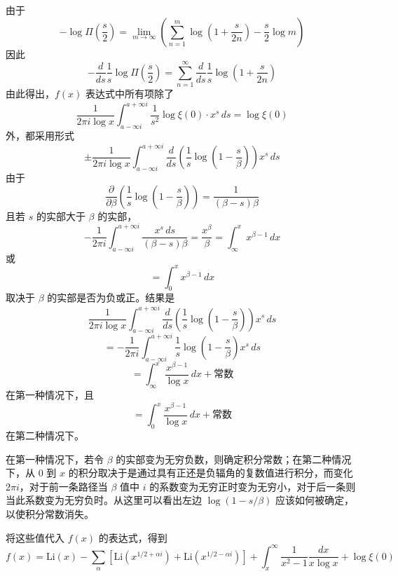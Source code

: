 由于
\[
-\log\Pi\left(\frac{s}{2}\right) = \lim_{m\to\infty} \left(\sum_{n=1}^{m} \log\left(1 + \frac{s}{2n}\right) - \frac{s}{2}\log m\right)
\]
因此
\[
-\frac{d}{ds}\frac{1}{s}\log\Pi\left(\frac{s}{2}\right) = \sum_{n=1}^{\infty} \frac{d}{ds}\frac{1}{s}\log\left(1 + \frac{s}{2n}\right)
\]
由此得出，$f(x)$ 表达式中所有项除了
\[
\frac{1}{2\pi i \log x} \int_{a-\infty i}^{a+\infty i} \frac{1}{s^2} \log\xi(0) \cdot x^s \, ds = \log\xi(0)
\]
外，都采用形式
\[
\pm \frac{1}{2\pi i \log x} \int_{a-\infty i}^{a+\infty i} \frac{d}{ds} \left(\frac{1}{s}\log\left(1 - \frac{s}{\beta}\right)\right) x^s \, ds
\]
由于
\[
\frac{\partial}{\partial \beta} \left( \frac{1}{s} \log\left(1 - \frac{s}{\beta}\right) \right) = \frac{1}{(\beta - s)\beta}
\]
且若 $s$ 的实部大于 $\beta$ 的实部，
\[
-\frac{1}{2\pi i} \int_{a-\infty i}^{a+\infty i} \frac{x^s \, ds}{(\beta-s)\beta} = \frac{x^{\beta}}{\beta} = \int_\infty^{x} x^{\beta-1} \, dx
\]
或
\[
= \int_0^{x} x^{\beta-1} \, dx
\]
取决于 $\beta$ 的实部是否为负或正。结果是
\[
\frac{1}{2\pi i \log x} \int_{a-\infty i}^{a+\infty i} \frac{d}{ds}\left(\frac{1}{s}\log\left(1 - \frac{s}{\beta}\right)\right) x^s \, ds
\]
\[
= -\frac{1}{2\pi i} \int_{a-\infty i}^{a+\infty i} \frac{1}{s}\log\left(1 - \frac{s}{\beta}\right) x^s \, ds
\]
\[
= \int_{\infty}^{x} \frac{x^{\beta-1}}{\log x} \, dx + \text{常数}
\]
在第一种情况下，且
\[
= \int_0^{x} \frac{x^{\beta-1}}{\log x} \, dx + \text{常数}
\]
在第二种情况下。

在第一种情况下，若令 $\beta$ 的实部变为无穷负数，则确定积分常数；在第二种情况下，从 0 到 $x$ 的积分取决于是通过具有正还是负辐角的复数值进行积分，而变化 $2\pi i$，对于前一条路径当 $\beta$ 值中 $i$ 的系数变为无穷正时变为无穷小，对于后一条则当此系数变为无穷负时。从这里可以看出左边 $\log(1 - s/\beta)$ 应该如何被确定，以使积分常数消失。

将这些值代入 $f(x)$ 的表达式，得到
\[
f(x) = \text{Li}(x) - \sum_{\alpha} \left[\text{Li}\left(x^{1/2+\alpha i}\right) + \text{Li}\left(x^{1/2-\alpha i}\right)\right] + \int_x^{\infty} \frac{1}{x^2-1}\frac{dx}{x\log x} + \log\xi(0)
\]

